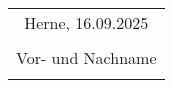 \smallbreak
\fontsize{12}{14}\selectfont
\begin{flushright}
  \begin{tabular}{c}
    Herne, 16.09.2025
    \vspace*{1cm} \\
    \dotfill \\
    Vor- und Nachname \\
    \hspace{5cm} \\
  \end{tabular}
\end{flushright}
